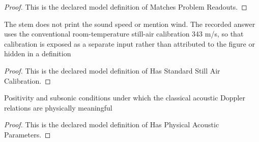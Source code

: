 \begin{proof}
  This is the declared model definition of Matches Problem Readouts.
\end{proof}
\begin{definition}
  \label{def:physics:phyx-mini-0214:phyxminiproblems-problemphyxmini0214-hasstandardstillaircalibration}
  The stem does not print the sound speed or mention wind. The recorded answer uses the conventional room-temperature still-air calibration 343 m/s, so that calibration is exposed as a separate input rather than attributed to the figure or hidden in a definition
\end{definition}
\begin{proof}
  This is the declared model definition of Has Standard Still Air Calibration.
\end{proof}
\begin{definition}
  \label{def:physics:phyx-mini-0214:phyxminiproblems-problemphyxmini0214-hasphysicalacousticparameters}
  Positivity and subsonic conditions under which the classical acoustic Doppler relations are physically meaningful
\end{definition}
\begin{proof}
  This is the declared model definition of Has Physical Acoustic Parameters.
\end{proof}

